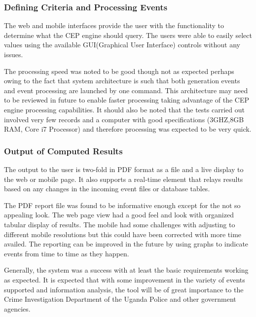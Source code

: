 \subsubsection{Defining Criteria and Processing Events}

\noindent The web and mobile interfaces provide the user with the functionality to determine what the CEP engine \cite{twentyfive} should query. The users were able to easily select values using the available GUI(Graphical User Interface) controls without any issues.

\noindent The processing speed was noted to be good though not as expected perhaps owing to the fact that system architecture is such that both generation events and event processing are launched by one command. This architecture may need to be reviewed in future to enable faster processing taking advantage of the CEP engine \cite{twentyfive} processing capabilities. It should also be noted that the tests carried out involved very few records and a computer with good specifications (3GHZ,8GB RAM, Core i7  Processor) and therefore processing was expected to be very quick.

\subsubsection{Output of Computed Results}

\noindent The output to the user is two-fold in PDF format as a file and a live display to the web or mobile page. It also supports a real-time element that relays results based on any changes in the incoming event files or database tables.

\noindent The PDF report file was found to be informative enough except for the not so appealing look. The web page view had a good feel and look with organized tabular display of results. The mobile had some challenges with adjusting to different mobile resolutions but this could have been corrected with more time availed. The reporting can be improved in the future by using graphs to indicate events from time to time as they happen.

\noindent Generally, the system was a success with at least the basic requirements working as expected. It is expected that with some improvement in the variety of events supported and information analysis, the tool will be of great importance to the Crime Investigation Department of the Uganda Police and other government agencies.
